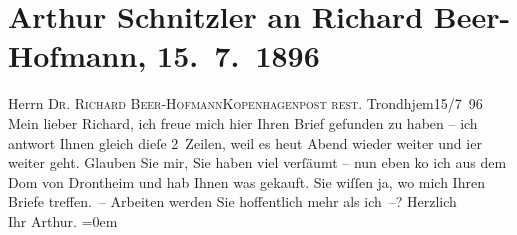 

         
         \renewcommand{\erwaehntePersonen}{Personen: Richard Beer-Hofmann}
         \renewcommand{\erwaehnteOrte}{Orte: Kopenhagen, Nidarosdom, Trondheim}
         \renewcommand{\erwaehnteWerke}{}
               \section[Arthur Schnitzler an Richard Beer-Hofmann, 15. 7. 1896]{ Arthur Schnitzler an Richard Beer-Hofmann, 15. 7. 1896}\nopagebreak{}\rehead{ }\begin{ledgroupsized}[t]{13cm}\normalsize\beginnumbering{} \toendnotes[C]{\smallbreak\pagebreak[2]} 
\pstart{}{\pb}Herrn \textsc{Dr. Richard
                     Beer-Hofmann}\pend{}\pstart{}\textsc{Kopenhagen}\pend{}\pstart{}\textsc{post rest.}\pend{}{\bigskip}\pstart
           \raggedleft{}{\pb}Trondhjem15/7 96\pend
           \pstart
           Mein lieber Richard, ich freue mich hier Ihren Brief gefunden zu
               haben – ich antwort Ihnen gleich dieſe 2 Zeilen, weil es heut Abend wieder weiter und
                  i{\geminationm}er weiter geht. Glauben Sie mir, Sie haben viel
               verſäumt – nun eben ko{\geminationm} ich aus dem Dom von Drontheim und hab Ihnen was gekauft.\pend
           \pstart
           Sie wiſſen ja, wo mich Ihren Briefe treffen. – Arbeiten werden Sie hoffentlich mehr
               als ich –?\pend
           \pstart
           Herzlich{\\[\baselineskip]}Ihr \spacefill\mbox{Arthur.}\pend
           \leftskip=0em{}
         
         \endnumbering{}\end{ledgroupsized}  \newcommand{\dateiname}{L00563}\newcommand{\titel}{Arthur Schnitzler an Richard Beer-Hofmann, 15. 7. 1896}\newcommand{\editorInnen}{Martin Anton Müller und Gerd-Hermann Susen}
      